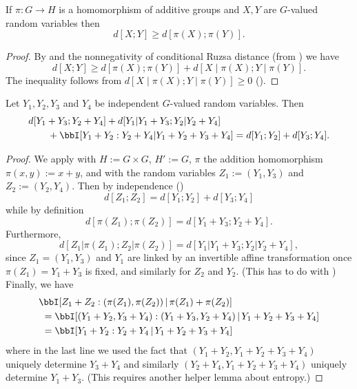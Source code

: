 \begin{corollary}\label{fibring-ineq}
  \leanok
If $\pi:G\to H$ is a homomorphism of additive groups and $X,Y$ are $G$-valued random variables then
\[d[X;Y]\geq d[\pi(X);\pi(Y)].\]
\end{corollary}

\begin{proof}\leanok
By  and the nonnegativity of conditional Ruzsa distance (from ) we have
\[d[X;Y]\geq d[\pi(X);\pi(Y)]+d[X\mid \pi(X);Y\mid \pi(Y)].\]
The inequality follows from $d[X\mid \pi(X);Y\mid \pi(Y)]\geq 0$ ().
\end{proof}


\begin{corollary}\label{cor-fibre}
  \leanok
  Let $Y_1,Y_2,Y_3$ and $Y_4$ be independent $G$-valued random variables.
  Then
\begin{align*}
  & d[Y_1+Y_3; Y_2+Y_4] + d[Y_1|Y_1+Y_3; Y_2|Y_2+Y_4] \\
  &\qquad + \bbI[Y_1+Y_2 : Y_2 + Y_4 | Y_1+Y_2+Y_3+Y_4] = d[Y_1; Y_2] + d[Y_3; Y_4].
\end{align*}
\end{corollary}

\begin{proof}\leanok
  We apply  with $H := G \times G$, $H' := G$, $\pi$ the addition homomorphism $\pi(x,y) := x+y$, and with the random variables $Z_1 := (Y_1,Y_3)$ and $Z_2 := (Y_2,Y_4)$.  Then by independence ()
\[
  d[Z_1; Z_2] = d[Y_1; Y_2] + d[Y_3; Y_4]
\]
while by definition
\[
  d[\pi(Z_1); \pi(Z_2)] = d[Y_1+Y_3; Y_2+Y_4].
\]
Furthermore,
\[
  d[Z_1|\pi(Z_1); Z_2|\pi(Z_2)] = d[Y_1|Y_1+Y_3;Y_2|Y_2+Y_4],
\]
since $Z_1=(Y_1,Y_3)$ and $Y_1$ are linked by an invertible affine transformation once $\pi(Z_1)=Y_1+Y_3$ is fixed, and similarly for $Z_2$ and $Y_2$.  (This has to do with )
Finally, we have
\begin{align*}
  &\bbI[Z_1 + Z_2 : (\pi(Z_1),\pi(Z_2)) \,|\, \pi(Z_1) + \pi(Z_2)] \\
  &\ = \bbI[(Y_1+Y_2, Y_3+Y_4) : (Y_1+Y_3, Y_2+Y_4) \,|\, Y_1+Y_2+Y_3+Y_4] \\
  &\ = \bbI[Y_1+Y_2 : Y_2+Y_4 \,|\, Y_1+Y_2+Y_3+Y_4]
\end{align*}
where in the last line we used the fact that $(Y_1+Y_2, Y_1+Y_2+Y_3+Y_4)$ uniquely determine $Y_3+Y_4$ and similarly
$(Y_2+Y_4, Y_1+Y_2+Y_3+Y_4)$ uniquely determine $Y_1+Y_3$.  (This requires another helper lemma about entropy.)
\end{proof}
